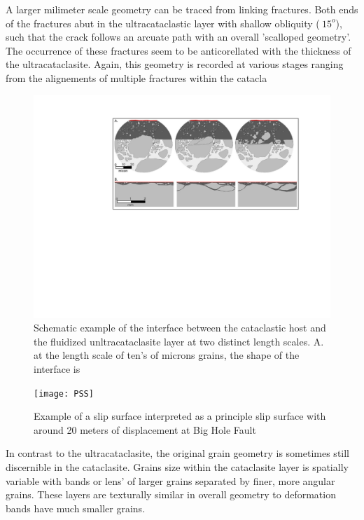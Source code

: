 \documentclass[12pt,a4paper]{article}
\begin{document}
	A larger milimeter scale geometry can be traced from linking fractures. Both ends of the fractures abut in the ultracataclastic layer with shallow obliquity ($~15^o$), such that the crack follows an arcuate path with an overall 'scalloped geometry'. The occurrence of these fractures seem to be anticorellated with the thickness of the ultracataclasite. Again, this geometry is recorded at various stages ranging from the alignements of multiple fractures within the catacla


\begin{figure}
	\centering

		\includegraphics[width=\textwidth]{microstructural_wear}
		\caption{Schematic example of the interface between the cataclastic host and the fluidized unltracataclasite layer at two distinct length scales. A. at the length scale of ten's of microns grains, the shape of the interface is  }
	\label{microstructural_wear}
\end{figure}	

\begin{figure}
	\centering
    \texttt{[image: PSS]}
	
	\caption{Example of a slip surface interpreted as a principle slip surface with around 20 meters of displacement at Big Hole Fault}
	\label{PSS}
\end{figure}
	
	In contrast to the ultracataclasite, the original grain geometry is sometimes still discernible in the cataclasite. Grains size within the cataclasite layer is spatially variable with bands or lens' of larger grains separated by finer, more angular grains. These  layers are texturally similar in overall geometry to deformation bands have much smaller grains.
\end{document}

